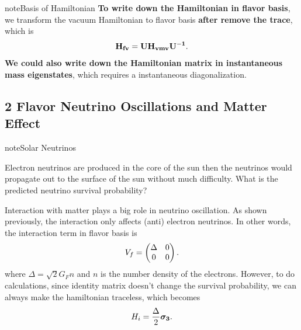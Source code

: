 \documentclass[letterpaper,12pt,english]{sphinxmanual}
\begin{document}
\begin{notice}{note}{Basis of Hamiltonian}
\textbf{To write down the Hamiltonian in flavor basis}, we transform the vacuum Hamiltonian to flavor basis \textbf{after remove the trace}, which is
\begin{gather}
\begin{split}\mathbf{H_{fv}} = \mathbf{U} \mathbf{H_{vmv}} \mathbf{U^{-1}}.\end{split}\notag
\end{gather}
\textbf{We could also write down the Hamiltonian matrix in instantaneous mass eigenstates}, which requires a instantaneous diagonalization.
\end{notice}


\subsection{2 Flavor Neutrino Oscillations and Matter Effect}
\label{msw:flavor-neutrino-oscillations-and-matter-effect}\label{msw:index-2}
\begin{notice}{note}{Solar Neutrinos}

Electron neutrinos are produced in the core of the sun then the neutrinos would propagate out to the surface of the sun without much difficulty. What is the predicted neutrino survival probability?
\end{notice}

Interaction with matter plays a big role in neutrino oscillation. As shown previously, the interaction only affects (anti) electron neutrinos. In other words, the interaction term in flavor basis is
\begin{gather}
\begin{split}V_f = \begin{pmatrix} \Delta & 0 \\ 0 & 0  \end{pmatrix}.\end{split}\notag
\end{gather}
where \(\Delta = \sqrt{2} G_F n\) and \(n\) is the number density of the electrons. However, to do calculations, since identity matrix doesn't change the survival probability, we can always make the hamiltonian traceless, which becomes
\begin{gather}
\begin{split}H_i=\frac{\Delta}{2} \boldsymbol{\sigma_3}.\end{split}\notag
\end{gather}
\end{document}
